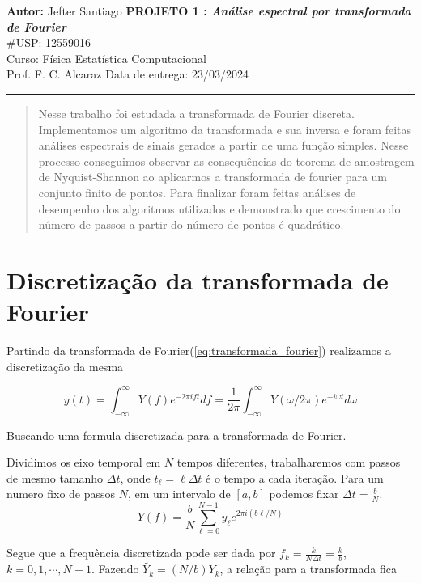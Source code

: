 \documentclass[a4paper, 11pt]{article}
\begin{document}
\noindent
\large\textbf{Autor:} Jefter Santiago \hfill \textbf{PROJETO 1 : {\color{blue} \emph{Análise espectral por transformada de Fourier}}}   \\
\#USP: 12559016 \\
\normalsize Curso: Física Estatística Computacional \\
Prof. F. C. Alcaraz \hfill Data de entrega: 23/03/2024 \\
\noindent\rule{7in}{2.8pt}

\begin{abstract}
  Nesse trabalho foi estudada a transformada de Fourier discreta. Implementamos um algoritmo
  da transformada e sua inversa e foram feitas análises espectrais de sinais gerados a partir
  de uma função simples. Nesse processo conseguimos observar as consequências do teorema de
  amostragem de Nyquist-Shannon ao aplicarmos a transformada de fourier para um conjunto finito
  de pontos. Para finalizar foram feitas análises de desempenho dos algoritmos utilizados
  e demonstrado que crescimento do número de passos a partir do número de pontos é quadrático.
\end{abstract}

\section{Discretização da transformada de Fourier}

Partindo da transformada de Fourier(\ref{eq:transformada_fourier}) realizamos a discretização
da mesma

\begin{equation}
  y(t) = \int_{-\infty}^{\infty}Y(f) e^{-2\pi i f t} df = \frac{1}{2\pi}\int_{-\infty}^{\infty} Y(\omega/2\pi) e^{-i\omega t} d \omega
  \label{eq:transformada_fourier}
\end{equation}



Buscando uma formula discretizada para a transformada de Fourier.

Dividimos os eixo temporal em $N$ tempos diferentes, trabalharemos
com passos de mesmo tamanho \( \Delta t \), onde \( t_\ell = \ell \Delta t \) é o tempo
a cada iteração. Para um numero fixo de passos $N$, em um intervalo
de \( [a, b] \) podemos fixar \( \Delta t = \frac{b}{N} \).
\[
  Y(f) = \frac{b}{N}  \sum_{\ell= 0}^{N - 1} y_\ell e^{2 \pi i(b\ell/N)}
\]

Segue que a frequência discretizada pode ser dada por \( f_k = \frac{k}{N\Delta t} = \frac{k}{b}\), \( k = 0, 1, \cdots , N-1
\). Fazendo \( \tilde{Y_k} = \left( N/b \right) Y_k \), a relação
para a transformada fica
\end{document}
